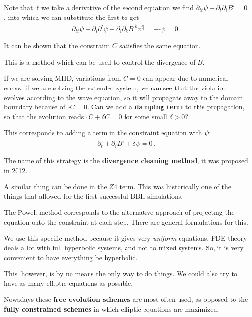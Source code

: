 \documentclass[main.tex]{subfiles}
\begin{document}
Note that if we take a derivative of the second equation we find \(\partial_{tt} \psi + \partial_{t} \partial_{i} B^{i} = 0\), into which we can substitute the first to get 
%
\begin{align}
\partial_{tt} \psi - \partial_{i} \partial^{i} \psi + \partial_{i} \partial_{k} B^{[k} v^{i]} = - \square \psi = 0
\,.
\end{align}
%

It can be shown that the constraint \(C\) satisfies the same equation. 


This is a method which can be used to control the divergence of \(B\). 

If we are solving MHD, variations from \(C=0\) can appear due to numerical errors: if we are solving the extended system, we can see that the violation evolves according to the wave equation, so it will propagate away to the domain boundary because of \(\square C = 0\). 
Can we add a \textbf{damping term} to this propagation, so that the evolution reads \(\square C + \delta \dot{C} = 0\) for some small \(\delta > 0\)?

This corresponds to adding a term in the constraint equation with \(\psi \): 
%
\begin{align}
\partial_{t} + \partial_{i} B^{i} + \delta \psi = 0   
\,.
\end{align}

The name of this strategy is the \textbf{divergence cleaning method}, it was proposed in 2012. 

A similar thing can be done in the \(Z4\) term.
This was historically one of the things that allowed for the first successful BBH simulations. 

The Powell method corresponds to the alternative approach of projecting the equation onto the constraint at each step. 
There are general formulations for this. 

We use this specific method because it gives very \emph{uniform} equations. 
PDE theory deals a lot with full hyperbolic systems, and not to mixed systems.
So, it is very convenient to have everything be hyperbolic. 

This, however, is by no means the only way to do things. 
We could also try to have as many elliptic equations as possible.

Nowadays these \textbf{free evolution schemes} are most often used, as opposed to the \textbf{fully constrained schemes} in which elliptic equations are maximized. 
\end{document}
